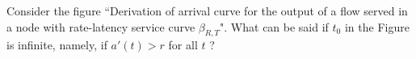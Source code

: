 \begin{problem}
Consider the figure ``Derivation of arrival curve for the output
of a flow
  served in a node with rate-latency service curve $\beta_{R,T}$".
What can be said if $t_{0}$ in the Figure is infinite, namely, if
$a'(t) > r$ for all $t$ ?
\end{problem}
